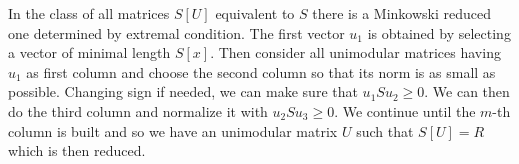\documentclass[10pt]{amsart}
\begin{document}
In the class of all matrices $S[U]$ equivalent to $S$ there is a Minkowski reduced one
determined by extremal condition. The first vector $u_1$ is obtained by selecting a vector
of minimal length $S[x]$. Then consider all unimodular matrices having $u_1$ as first
column and choose the second column so that its norm is as small as possible. Changing
sign if needed, we can make sure that $u_1 S u_2 \geq 0$. We can then do the third
column and normalize it with $u_2 S u_3\geq 0$. We continue until the $m$-th column is
built and so we have an unimodular matrix $U$ such that $S[U] = R$ which is then reduced.









\end{document}
